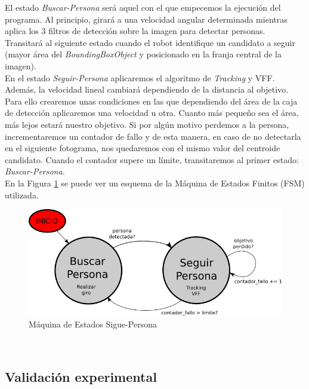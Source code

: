 El estado \textit{Buscar-Persona} será aquel con el que empecemos la ejecución del programa. Al principio, girará a una velocidad angular determinada mientras aplica los 3 filtros de detección sobre la imagen para detectar personas. Transitará al siguiente estado cuando el robot identifique un candidato a seguir (mayor área del \textit{BoundingBoxObject} y posicionado en la franja central de la imagen).\\

En el estado \textit{Seguir-Persona} aplicaremos el algoritmo de \textit{Tracking} y VFF. Además, la velocidad lineal cambiará dependiendo de la distancia al objetivo. Para ello crearemos unas condiciones en las que dependiendo del área de la caja de detección aplicaremos una velocidad u otra. Cuanto más pequeño sea el área, más lejos estará nuestro objetivo. Si por algún motivo perdemos a la persona, incrementaremos un contador de fallo y de esta manera, en caso de no detectarla en el siguiente fotograma, nos quedaremos con el mismo valor del centroide candidato. Cuando el contador supere un límite, transitaremos al primer estado: \textit{Buscar-Persona}.\\

En la Figura \ref{fig:maquina_estados} se puede ver un esquema de la Máquina de Estados Finitos (FSM) utilizada.\\

\begin{figure} [H]
  \begin{center}
    \includegraphics[width=12cm]{imagenes/cap6/maquina-estados.png}
  \end{center}
  \caption[Máquina de Estados Sigue-Persona]{Máquina de Estados Sigue-Persona}
  \label{fig:maquina_estados}
\end{figure}\


\subsection{Validación experimental}
\label{subsec:validacion_experimental_sim}

